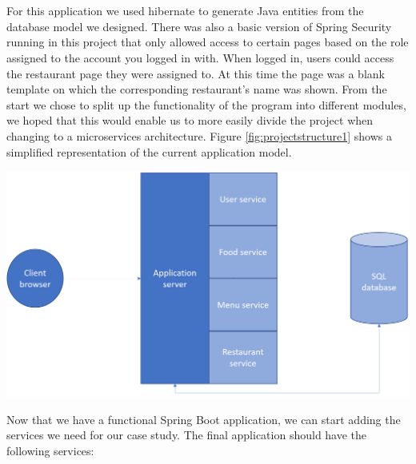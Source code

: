 \documentclass[12pt]{article}
\newenvironment{Figure}
	{\par\medskip\noindent\minipage{\linewidth}}
	{\endminipage\par\medskip}
\begin{document}
\begin{multicols}{2}
\\\\
For this application we used hibernate to generate Java entities from the database model we designed. There was also a basic version of Spring Security running in this project that only allowed access to certain pages based on the role assigned to the account you logged in with. When logged in, users could access the restaurant page they were assigned to. At this time the page was a blank template on which the corresponding restaurant's name was shown. From the start we chose to split up the functionality of the program into different modules, we hoped that this would enable us to more easily divide the project when changing to a microservices architecture. Figure \ref{fig:projectstructure1} shows a simplified representation of the current application model.
\begin{Figure}
	\centering
	\includegraphics[width=\linewidth]{illustrations/projectstructure1.png}
	\label{fig:projectstructure1}
\end{Figure}
\noindent Now that we have a functional Spring Boot application, we can start adding the services we need for our case study. The final application should have the following services:


\end{multicols}
\end{document}
